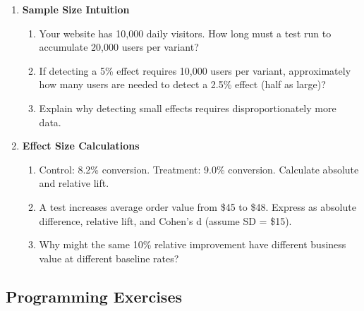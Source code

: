 \begin{enumerate}
    \item \textbf{Sample Size Intuition}
    \begin{enumerate}
        \item Your website has 10,000 daily visitors. How long must a test run to accumulate 20,000 users per variant?
        \item If detecting a 5\% effect requires 10,000 users per variant, approximately how many users are needed to detect a 2.5\% effect (half as large)?
        \item Explain why detecting small effects requires disproportionately more data.
    \end{enumerate}

    \item \textbf{Effect Size Calculations}
    \begin{enumerate}
        \item Control: 8.2\% conversion. Treatment: 9.0\% conversion. Calculate absolute and relative lift.
        \item A test increases average order value from \$45 to \$48. Express as absolute difference, relative lift, and Cohen's d (assume SD = \$15).
        \item Why might the same 10\% relative improvement have different business value at different baseline rates?
    \end{enumerate}
\end{enumerate}

\subsection{Programming Exercises}

